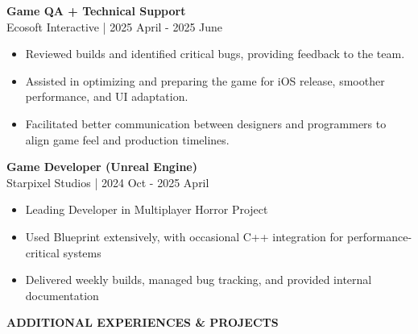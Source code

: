 \documentclass[11pt,a4paper]{article}
\newcommand{\jobentry}[2]{%
    \textbf{#1}\\
    {\small\color{lighttext}#2}\\[4pt]%
}
\begin{document}
\begin{minipage}[t]{14cm}
\begin{minipage}[t]{12.5cm}
\vspace{0.5cm}

\jobentry{Game QA + Technical Support}{Ecosoft Interactive | 2025 April - 2025 June}
\begin{itemize}[leftmargin=*, nosep, itemsep=2pt, topsep=2pt]
    \item Reviewed builds and identified critical bugs, providing feedback to the team.
    \item Assisted in optimizing and preparing the game for iOS release, smoother performance, and UI adaptation.
    \item Facilitated better communication between designers and programmers to align game feel and production timelines.
\end{itemize}

\vspace{0.5cm}

\jobentry{Game Developer (Unreal Engine)}{Starpixel Studios | 2024 Oct - 2025 April}
\begin{itemize}[leftmargin=*, nosep, itemsep=2pt, topsep=2pt]
    \item Leading Developer in Multiplayer Horror Project
    \item Used Blueprint extensively, with occasional C++ integration for performance-critical systems
    \item Delivered weekly builds, managed bug tracking, and provided internal documentation
\end{itemize}

\end{minipage}
\end{minipage}

\newpage


\vspace{1.2cm}

\begin{center}
{\large\bfseries\MakeUppercase{Additional Experiences \& Projects}}
\end{center}
\end{document}
